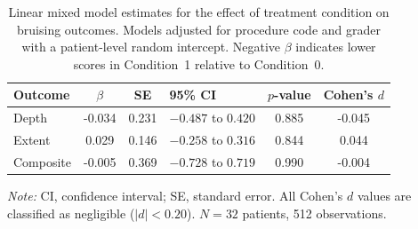 \begin{table}[htbp]
\centering
\caption{Linear mixed model estimates for the effect of treatment condition on bruising outcomes. Models adjusted for procedure code and grader with a patient-level random intercept. Negative $\beta$ indicates lower scores in Condition~1 relative to Condition~0.}
\label{tab:lmm}
\begin{tabular}{l S[table-format=-1.3] S[table-format=1.3] l S[table-format=1.3] S[table-format=-1.3]}
\toprule
{Outcome} & {$\beta$} & {SE} & {95\% CI} & {$p$-value} & {Cohen's $d$} \\
\midrule
Depth     & -0.034 & 0.231 & $-0.487$ to $0.420$ & 0.885 & -0.045 \\
Extent    &  0.029 & 0.146 & $-0.258$ to $0.316$ & 0.844 &  0.044 \\
Composite & -0.005 & 0.369 & $-0.728$ to $0.719$ & 0.990 & -0.004 \\
\bottomrule
\end{tabular}
\smallskip

\noindent\textit{Note:} CI, confidence interval; SE, standard error. All Cohen's $d$ values are classified as negligible ($|d| < 0.20$). $N = 32$ patients, 512 observations.
\end{table}
